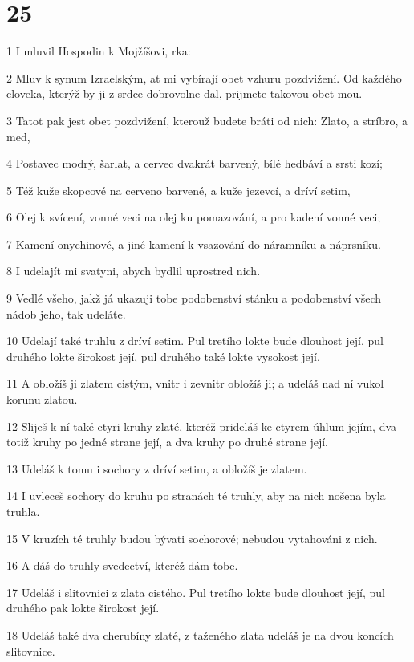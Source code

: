 \chapter{25}

\par 1 I mluvil Hospodin k Mojžíšovi, rka:
\par 2 Mluv k synum Izraelským, at mi vybírají obet vzhuru pozdvižení. Od každého cloveka, kterýž by ji z srdce dobrovolne dal, prijmete takovou obet mou.
\par 3 Tatot pak jest obet pozdvižení, kterouž budete bráti od nich: Zlato, a stríbro, a med,
\par 4 Postavec modrý, šarlat, a cervec dvakrát barvený, bílé hedbáví a srsti kozí;
\par 5 Též kuže skopcové na cerveno barvené, a kuže jezevcí, a dríví setim,
\par 6 Olej k svícení, vonné veci na olej ku pomazování, a pro kadení vonné veci;
\par 7 Kamení onychinové, a jiné kamení k vsazování do náramníku a náprsníku.
\par 8 I udelajít mi svatyni, abych bydlil uprostred nich.
\par 9 Vedlé všeho, jakž já ukazuji tobe podobenství stánku a podobenství všech nádob jeho, tak udeláte.
\par 10 Udelají také truhlu z dríví setim. Pul tretího lokte bude dlouhost její, pul druhého lokte širokost její, pul druhého také lokte vysokost její.
\par 11 A obložíš ji zlatem cistým, vnitr i zevnitr obložíš ji; a udeláš nad ní vukol korunu zlatou.
\par 12 Sliješ k ní také ctyri kruhy zlaté, kteréž prideláš ke ctyrem úhlum jejím, dva totiž kruhy po jedné strane její, a dva kruhy po druhé strane její.
\par 13 Udeláš k tomu i sochory z dríví setim, a obložíš je zlatem.
\par 14 I uvleceš sochory do kruhu po stranách té truhly, aby na nich nošena byla truhla.
\par 15 V kruzích té truhly budou bývati sochorové; nebudou vytahováni z nich.
\par 16 A dáš do truhly svedectví, kteréž dám tobe.
\par 17 Udeláš i slitovnici z zlata cistého. Pul tretího lokte bude dlouhost její, pul druhého pak lokte širokost její.
\par 18 Udeláš také dva cherubíny zlaté, z taženého zlata udeláš je na dvou koncích slitovnice.
